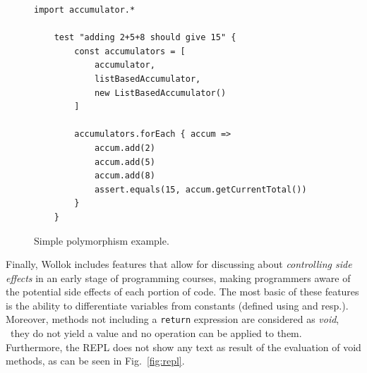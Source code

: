 \begin{figure}[ht]
\vspace{-3mm}
 \centering
 \begin{lstlisting}[language=Wollok]
 	import accumulator.*

	test "adding 2+5+8 should give 15" {
		const accumulators = [ 
			accumulator, 
			listBasedAccumulator,
			new ListBasedAccumulator()
		]

		accumulators.forEach { accum =>
			accum.add(2)
			accum.add(5)
			accum.add(8)
			assert.equals(15, accum.getCurrentTotal())	
		}
	}\end{lstlisting}
\vspace{-3mm}
\caption{\small Simple polymorphism example.}
\label{fig:polymorphism}
\end{figure}

Finally, Wollok includes features that allow for discussing about \emph{controlling side effects} in an early stage of programming courses, making programmers aware of the potential side effects of each portion of code.
The most basic of these features is the ability to 
differentiate variables from constants (defined using  and  resp.).
Moreover, methods not including a \texttt{return} expression are considered as \emph{void}, \ie\ they do not yield a value and no operation can be applied to them. Furthermore, the REPL does not show any text as result of the evaluation of void methods, as can be seen in Fig.~\ref{fig:repl}.

